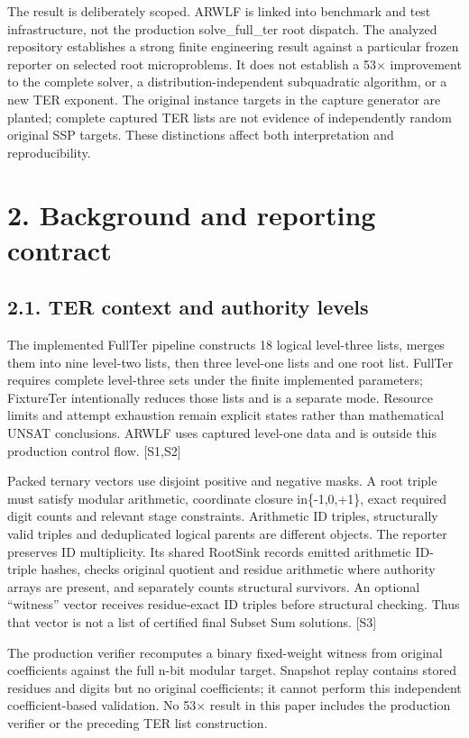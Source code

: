 \documentclass[10pt,letterpaper]{article}
\begin{document}
The result is deliberately scoped. ARWLF is linked into benchmark and test infrastructure, not the production solve\_full\_ter root dispatch. The analyzed repository establishes a strong finite engineering result against a particular frozen reporter on selected root microproblems. It does not establish a 53\ensuremath{\times} improvement to the complete solver, a distribution-independent subquadratic algorithm, or a new TER exponent. The original instance targets in the capture generator are planted; complete captured TER lists are not evidence of independently random original SSP targets. These distinctions affect both interpretation and reproducibility.


\section*{2. Background and reporting contract}

\subsection*{2.1. TER context and authority levels}

The implemented FullTer pipeline constructs 18 logical level-three lists, merges them into nine level-two lists, then three level-one lists and one root list. FullTer requires complete level-three sets under the finite implemented parameters; FixtureTer intentionally reduces those lists and is a separate mode. Resource limits and attempt exhaustion remain explicit states rather than mathematical UNSAT conclusions. ARWLF uses captured level-one data and is outside this production control flow. [S1,S2]


Packed ternary vectors use disjoint positive and negative masks. A root triple must satisfy modular arithmetic, coordinate closure in\{-1,0,+1\}, exact required digit counts and relevant stage constraints. Arithmetic ID triples, structurally valid triples and deduplicated logical parents are different objects. The reporter preserves ID multiplicity. Its shared RootSink records emitted arithmetic ID-triple hashes, checks original quotient and residue arithmetic where authority arrays are present, and separately counts structural survivors. An optional ``witness'' vector receives residue-exact ID triples before structural checking. Thus that vector is not a list of certified final Subset Sum solutions. [S3]


The production verifier recomputes a binary fixed-weight witness from original coefficients against the full n-bit modular target. Snapshot replay contains stored residues and digits but no original coefficients; it cannot perform this independent coefficient-based validation. No 53\ensuremath{\times} result in this paper includes the production verifier or the preceding TER list construction.
\end{document}
